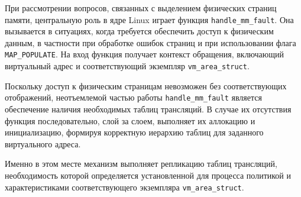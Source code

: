 При рассмотрении вопросов, связанных с выделением физических страниц памяти, центральную роль в ядре Linux играет функция \texttt{handle\_mm\_fault}. Она вызывается в ситуациях, когда требуется обеспечить доступ к физическим данным, в частности при обработке ошибок страниц и при использовании флага \texttt{MAP\_POPULATE}. На вход функция получает контекст обращения, включающий виртуальный адрес и соответствующий экземпляр \texttt{vm\_area\_struct}.

Поскольку доступ к физическим страницам невозможен без соответствующих отображений, неотъемлемой частью работы \texttt{handle\_mm\_fault} является обеспечение наличия необходимых таблиц трансляций. В случае их отсутствия функция последовательно, слой за слоем, выполняет их аллокацию и инициализацию, формируя корректную иерархию таблиц для заданного виртуального адреса.

Именно в этом месте механизм выполняет репликацию таблиц трансляций, необходимость которой определяется установленной для процесса политикой и характеристиками соответствующего экземпляра \texttt{vm\_area\_struct}.

